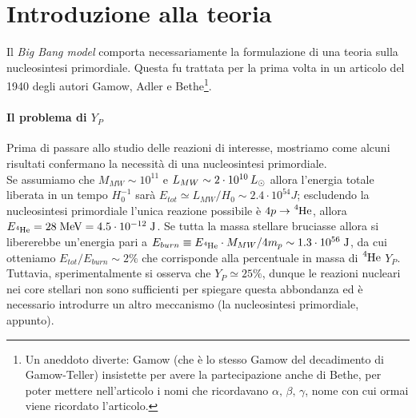 \section{Introduzione alla teoria}
Il \textit{Big Bang model} comporta necessariamente la formulazione di una teoria sulla nucleosintesi primordiale. Questa fu trattata per la prima volta in un articolo del 1940 degli autori Gamow, Adler e Bethe\footnote{Un aneddoto diverte: Gamow (che è lo stesso Gamow del decadimento di Gamow-Teller) insistette per avere la partecipazione anche di Bethe, per poter mettere nell'articolo i nomi  che ricordavano $\alpha,\,\beta,\,\gamma$, nome con cui ormai viene ricordato l'articolo.}.

\paragraph{Il problema di $Y_P$} Prima di passare allo studio delle reazioni di interesse, mostriamo come alcuni risultati confermano la necessità di una nucleosintesi primordiale.\\
Se assumiamo che $M_{MW} \sim 10^{11}$ \Msol{} e $L_{MW}\sim 2\cdot 10^{10}\,L_{\odot} {}$ allora l'energia totale liberata in un tempo $H_0^{-1}$ sarà $E_{tot} \simeq L_{MW}/H_0\sim 2.4\cdot 10^{54}\unit{J}$; escludendo la nucleosintesi primordiale l'unica reazione possibile è $4p\to\ce{^4He}$, allora $E_{\ce{^4He}} = 28\unit{MeV}= 4.5 \cdot \ord{-12}\unit{J}$. Se tutta la massa stellare bruciasse allora si libererebbe un'energia pari a $E_{burn} \equiv E_{\ce{^4He}}\cdot M_{MW}/4m_p\sim 1.3\cdot \ord{56}\unit{J}$, da cui otteniamo $E_{tot}/E_{burn}\sim 2\%$ che corrisponde alla percentuale in massa di $\ce{^4He}$  $Y_P$. Tuttavia, sperimentalmente si osserva che $Y_P\simeq 25\%$, dunque le reazioni nucleari nei core stellari non sono sufficienti per spiegare questa abbondanza ed è necessario introdurre un altro meccanismo (la nucleosintesi primordiale, appunto).

